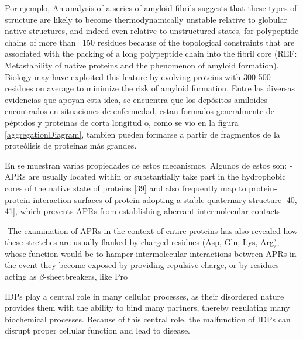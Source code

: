 Por ejemplo, 
An analysis of a series of amyloid fibrils suggests that these types of structure are likely to become thermodynamically unstable relative to globular native structures, and indeed even relative to unstructured states, for
polypeptide chains of more than ~150 residues because of the topological constraints that are associated with the
packing of a long polypeptide chain into the fibril core (REF: Metastability of native proteins and the phenomenon of amyloid formation).
Biology may have exploited this feature by evolving proteins with 300-500 residues on average to minimize the risk of amyloid formation. 
Entre las diversas evidencias que apoyan esta idea, se encuentra que los depósitos amiloides encontrados en situaciones de enfermedad, 
estan formados generalmente de péptidos y proteinas de corta longitud o, como se vio en la figura \ref{aggregationDiagram}, tambien pueden formarse a partir de fragmentos de la proteólisis de proteinas más grandes.



En \cite{knowles2014amyloid} se muestran varias propiedades de estos mecanismos. 
Algunos de estos son:
-APRs are usually located within or substantially take part in the hydrophobic cores of the native state of proteins [39] and also frequently map to protein-protein interaction surfaces of protein adopting
a stable quaternary structure [40, 41], which prevents APRs from establishing aberrant intermolecular contacts

-The examination of APRs in the context of entire proteins has also revealed how these stretches are usually flanked by charged residues (Asp, Glu, Lys, Arg), whose
function would be to hamper intermolecular interactions between APRs in the event they become exposed by providing repulsive charge, or by residues acting as $\beta$-sheetbreakers, like Pro


IDPs play a central role in many cellular processes, as their disordered nature provides them with the ability to bind many partners, thereby regulating many biochemical
processes. Because of this central role, the malfunction of IDPs can disrupt proper cellular function and lead to disease.


